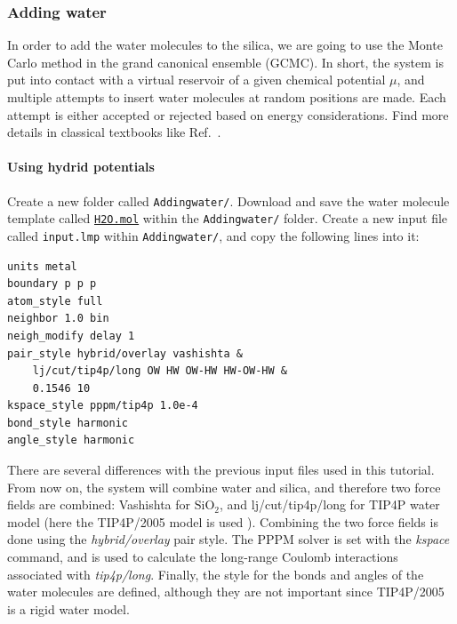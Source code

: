\documentclass[9pt,tutorial]{livecoms}
\newcommand{\flrcmd}[1]{\textcolor{command}{\texttt{#1}}} %
\newcommand{\flecmd}[1]{\textcolor{command}{\texttt{#1}}} %
\newcommand{\dwlcmd}[1]{\textcolor{download}{\texttt{#1}}} %
\newcommand{\filepath}{https://raw.githubusercontent.com/lammpstutorials/lammpstutorials-article/main/files/}
\begin{document}
\subsubsection{Adding water}
\noindent In order to add the water molecules to the silica, we are going to use
the Monte Carlo method in the grand canonical ensemble (GCMC). In short, the
system is put into contact with a virtual reservoir of a given chemical potential
$\mu$, and multiple attempts to insert water molecules at random positions are
made. Each attempt is either accepted or rejected based on energy considerations.
Find more details in classical textbooks like Ref.~.

\paragraph{Using hydrid potentials}
\noindent Create a new folder called \flrcmd{Addingwater/}. Download and save
the water molecule template called
\href{\filepath tutorial6/H2O.mol}{\dwlcmd{H2O.mol}}
within the \flrcmd{Addingwater/} folder. Create a new input file called \flecmd{input.lmp}
within \flrcmd{Addingwater/}, and copy the following lines into it:
\begin{lstlisting}
units metal
boundary p p p
atom_style full
neighbor 1.0 bin
neigh_modify delay 1
pair_style hybrid/overlay vashishta &
    lj/cut/tip4p/long OW HW OW-HW HW-OW-HW &
    0.1546 10
kspace_style pppm/tip4p 1.0e-4
bond_style harmonic
angle_style harmonic
\end{lstlisting}
There are several differences with the previous input files used in this tutorial.
From now on, the system will combine water and silica, and therefore two force
fields are combined: Vashishta for $\text{SiO}_2$, and lj/cut/tip4p/long for
TIP4P water model (here the TIP4P/2005 model is used \cite{abascal2005general}).
Combining the two force fields is done using the \textit{hybrid/overlay} pair
style. The PPPM solver \cite{luty1996calculating} is set with the \textit{kspace}
command, and is used to calculate the long-range Coulomb interactions associated
with \textit{tip4p/long}. Finally, the style for the bonds
and angles of the water molecules are defined, although they are not important
since TIP4P/2005 is a rigid water model.
\end{document}
